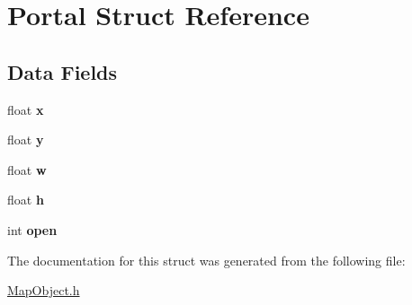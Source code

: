 \hypertarget{struct_portal}{}\section{Portal Struct Reference}
\label{struct_portal}
\subsection*{Data Fields}
\begin{DoxyCompactItemize}
\item 
\hypertarget{struct_portal_ad0da36b2558901e21e7a30f6c227a45e}{}float {\bfseries x}\label{struct_portal_ad0da36b2558901e21e7a30f6c227a45e}

\item 
\hypertarget{struct_portal_aa4f0d3eebc3c443f9be81bf48561a217}{}float {\bfseries y}\label{struct_portal_aa4f0d3eebc3c443f9be81bf48561a217}

\item 
\hypertarget{struct_portal_a56eca241e2896b9f57a79589e76fd24b}{}float {\bfseries w}\label{struct_portal_a56eca241e2896b9f57a79589e76fd24b}

\item 
\hypertarget{struct_portal_a85f2f1bd58b3b44ffdf3881823393959}{}float {\bfseries h}\label{struct_portal_a85f2f1bd58b3b44ffdf3881823393959}

\item 
\hypertarget{struct_portal_a79892741103741834f229b20718e4f19}{}int {\bfseries open}\label{struct_portal_a79892741103741834f229b20718e4f19}

\end{DoxyCompactItemize}


The documentation for this struct was generated from the following file\+:\begin{DoxyCompactItemize}
\item 
\hyperlink{_map_object_8h}{Map\+Object.\+h}\end{DoxyCompactItemize}
